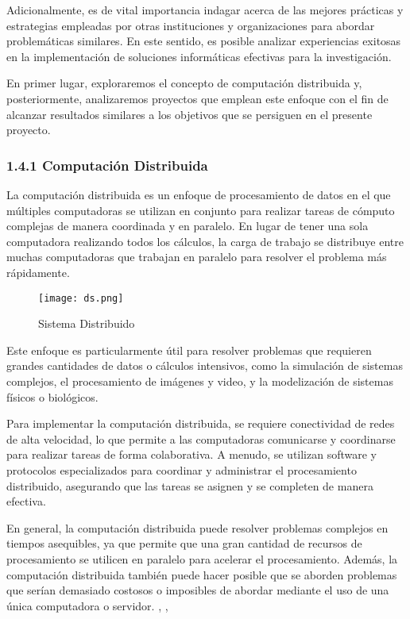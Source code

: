 \begin{spacing}{1.5}
Adicionalmente, es de vital importancia indagar acerca de las mejores prácticas y estrategias empleadas por otras instituciones y organizaciones para abordar problemáticas similares. En este sentido, es posible analizar experiencias exitosas en la implementación de soluciones informáticas efectivas para la investigación.

En primer lugar, exploraremos el concepto de computación distribuida y, posteriormente, analizaremos proyectos que emplean este enfoque con el fin de alcanzar resultados similares a los objetivos que se persiguen en el presente proyecto.

  \subsubsection{1.4.1 Computación Distribuida}

  La computación distribuida es un enfoque de procesamiento de datos en el que
  múltiples computadoras se utilizan en conjunto para realizar tareas de cómputo
  complejas de manera coordinada y en paralelo. En lugar de tener una sola
  computadora realizando todos los cálculos, la carga de trabajo se distribuye
  entre muchas computadoras que trabajan en paralelo para resolver el problema
  más rápidamente.

  \begin{figure}[h]
    \centering
    \texttt{[image: ds.png]}
    \caption{Sistema Distribuido}
    \label{fig:etiqueta}
  \end{figure}

  Este enfoque es particularmente útil para resolver problemas que requieren
  grandes cantidades de datos o cálculos intensivos, como la simulación de
  sistemas complejos, el procesamiento de imágenes y video, y la modelización de
  sistemas físicos o biológicos.

  Para implementar la computación distribuida, se requiere conectividad de
  redes de alta velocidad, lo que permite a las computadoras comunicarse y
  coordinarse para realizar tareas de forma colaborativa. A menudo, se utilizan
  software y protocolos especializados para coordinar y administrar el
  procesamiento distribuido, asegurando que las tareas se asignen y se completen
  de manera efectiva.

  En general, la computación distribuida puede resolver problemas complejos en
  tiempos asequibles, ya que permite que una gran cantidad de recursos de
  procesamiento se utilicen en paralelo para acelerar el procesamiento. Además,
  la computación distribuida también puede hacer posible que se aborden problemas
  que serían demasiado costosos o imposibles de abordar mediante el uso de una
  única computadora o servidor. \cite{distributed-1}, \cite{distributed-4},
  \cite{distributed-3}


\end{spacing}
